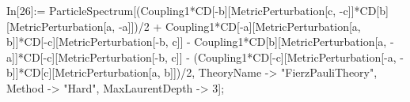 In[26]:= ParticleSpectrum[(Coupling1*CD[-b][MetricPerturbation[c, -c]]*CD[b][MetricPerturbation[a, -a]])/2 + Coupling1*CD[-a][MetricPerturbation[a, b]]*CD[-c][MetricPerturbation[-b, c]] - Coupling1*CD[b][MetricPerturbation[a, -a]]*CD[-c][MetricPerturbation[-b, c]] - (Coupling1*CD[-c][MetricPerturbation[-a, -b]]*CD[c][MetricPerturbation[a, b]])/2, TheoryName -> "FierzPauliTheory", Method -> "Hard", MaxLaurentDepth -> 3]; 